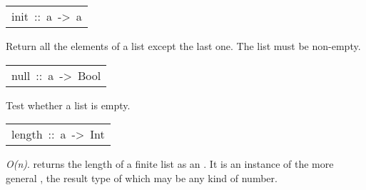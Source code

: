 \begin{haddockdesc}
\item[\begin{tabular}{@{}l}
init\ ::\ {\char 91}a{\char 93}\ ->\ {\char 91}a{\char 93}
\end{tabular}]\haddockbegindoc
Return all the elements of a list except the last one.
 The list must be non-empty.
\par

\end{haddockdesc}
\begin{haddockdesc}
\item[\begin{tabular}{@{}l}
null\ ::\ {\char 91}a{\char 93}\ ->\ Bool
\end{tabular}]\haddockbegindoc
Test whether a list is empty.
\par

\end{haddockdesc}
\begin{haddockdesc}
\item[\begin{tabular}{@{}l}
length\ ::\ {\char 91}a{\char 93}\ ->\ Int
\end{tabular}]\haddockbegindoc
\emph{O(n)}.  returns the length of a finite list as an .
 It is an instance of the more general ,
 the result type of which may be any kind of number.
\par

\end{haddockdesc}
